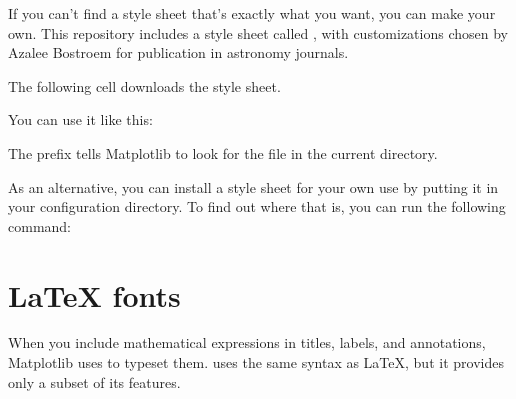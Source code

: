 \documentclass[letterpaper,10pt,english]{sphinxmanual}
\begin{document}
If you can’t find a style sheet that’s exactly what you want, you can make your own.  This repository includes a style sheet called , with customizations chosen by Azalee Bostroem for publication in astronomy journals.

The following cell downloads the style sheet.

\begin{sphinxVerbatim}[commandchars=\\\{\}]
 

  
  

  
\end{sphinxVerbatim}

You can use it like this:

\begin{sphinxVerbatim}[commandchars=\\\{\}]
\end{sphinxVerbatim}

The prefix  tells Matplotlib to look for the file in the current directory.

As an alternative, you can install a style sheet for your own use by putting it in your configuration directory.  To find out where that is, you can run the following command:

\begin{sphinxVerbatim}[commandchars=\\\{\}]
   

\end{sphinxVerbatim}


\section{LaTeX fonts}
\label{\detokenize{07_plot:latex-fonts}}
When you include mathematical expressions in titles, labels, and annotations, Matplotlib uses  to typeset them.   uses the same syntax as LaTeX, but it provides only a subset of its features.
\end{document}
